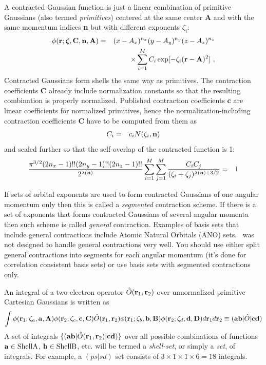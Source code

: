 \documentclass[10pt]{article}
\begin{document}
A contracted Gaussian function is just a linear combination of primitive Gaussians (also termed {\em primitives})
centered at the same center {\bf A} and with the same momentum indices {\bf n}
but with different exponents $\zeta_i$:
\begin{eqnarray}
\phi ({\bf r}; \bmath{\zeta}, {\bf C}, \n, {\bf A}) & = & (x - A_x)^{n_x} (y - A_y)^{n_y} (z - A_z)^{n_z} \nonumber \\
& & \times \sum_{i=1}^M C_i \exp [-\zeta_i ({\bf r}-{\bf A})^2]\ ,
\end{eqnarray}
Contracted Gaussians form shells the same way as primitives.
The contraction coefficients {\bf C} already include normalization constants so that the resulting combination
is properly normalized. Published contraction coefficients {\bf c} are linear coefficients for normalized primitives,
hence the normalization-including contraction coefficients {\bf C} have to be computed from them as
\begin{eqnarray} \label{eq:C1}
C_i & = & c_i N(\zeta_i,{\bf n})
\end{eqnarray}
and scaled further so that the self-overlap of the contracted function is 1:
\begin{eqnarray} \label{eq:C2}
\frac{\pi^{3/2} (2n_x-1)!!(2n_y-1)!!(2n_z-1)!!}{2^{\lambda({\bf n})}}
\sum_{i=1}^M \sum_{j=1}^M \frac{C_i C_j }{(\zeta_i+\zeta_j)^{\lambda({\bf n})+3/2}} & = & 1
\end{eqnarray}

If sets of orbital exponents are used to form contracted Gaussians of one angular momentum only
then this is called a {\em segmented} contraction scheme. If there is a set of exponents that forms
contracted Gaussians of several angular momenta then such scheme is called {\em general} contraction.
Examples of basis sets that include general contractions include Atomic Natural Orbitals (ANO) sets.
\LIBINT\ was not designed to handle general contractions very well. You should use either split general contractions
into segments for each angular momentum (it's done for correlation consistent basis sets)
or use basis sets with segmented contractions only.

An integral of a two-electron operator $\hat{O}({\bf r}_1, {\bf r}_2)$ over unnormalized
primitive Cartesian Gaussians is written as
\begin{eqnarray}
\int \phi({\bf r}_1; \zeta_a, {\bf a}, {\bf A}) \phi ({\bf r}_2; \zeta_c, {\bf c}, {\bf C}) \hat{O}({\bf r}_1, {\bf r}_2)
\phi({\bf r}_1; \zeta_b, {\bf b}, {\bf B}) \phi({\bf r}_2; \zeta_d, {\bf d}, {\bf D}) d{\bf r}_1 d{\bf r}_2 \equiv ({\bf ab} |\hat{O}|{\bf cd})
\end{eqnarray}
A set of integrals $\{ ({\bf a} {\bf b}|\hat{O}({\bf r}_1, {\bf r}_2)|{\bf c} {\bf d}) \}$
over all possible combinations of functions ${\bf a} \in {\rm Shell A}$, ${\bf b} \in {\rm Shell B}$, etc.
will be termed a {\em shell-set}, or simply a {\em set}, of integrals. For example, a $(ps|sd)$ set consists of
$3 \times 1 \times 1 \times 6 = 18$ integrals.
\end{document}
